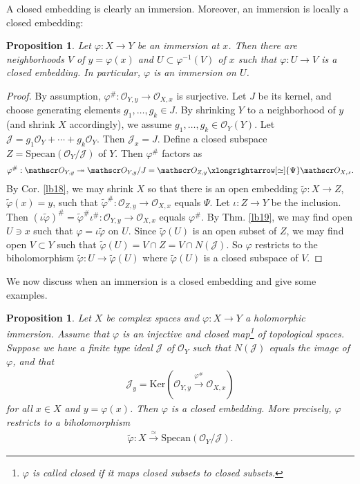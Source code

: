 \documentclass[12pt,b5paper,notitlepage]{report}
\theoremstyle{definition}
\theoremstyle{plain}
\newtheorem{pp}[df]{Proposition}
\newcommand{\mc}{\mathcal}
\newcommand{\wtd}{\widetilde}
\newcommand{\scr}{\mathscr}
\newcommand{\Ker}{\mathrm{Ker}}
\newcommand{\Specan}{\mathrm{Specan}}
\numberwithin{equation}{section}
\begin{document}
A closed embedding is clearly an immersion. Moreover, an immersion is locally a closed embedding:




\begin{pp}\label{lb21}
Let $\varphi:X\rightarrow Y$ be an immersion at $x$. Then there are neighborhoods $V$ of $y=\varphi(x)$ and $U\subset\varphi^{-1}(V)$ of $x$  such that $\varphi:U\rightarrow V$ is a closed embedding. In particular, $\varphi$ is an immersion on $U$.
\end{pp}




\begin{proof}
By assumption, $\varphi^\#:\scr O_{Y,y}\rightarrow\scr O_{X,x}$ is surjective. Let $J$ be its kernel, and choose generating elements $g_1,\dots,g_k\in J$. By shrinking $Y$ to a neighborhood of $y$ (and shrink $X$ accordingly), we assume $g_1,\dots,g_k\in\scr O_Y(Y)$. Let $\mc J=g_1\scr O_Y+\cdots+g_k\scr O_Y$. Then $\mc J_x=J$. Define a closed subspace $Z=\Specan(\scr O_Y/\mc J)$ of $Y$. Then $\varphi^\#$ factors as
\begin{align*}
\varphi^\#:\scr O_{Y,y}\twoheadrightarrow \scr O_{Y,y}/J=\scr O_{Z,y}\xlongrightarrow[\simeq]{\Psi}\scr O_{X,x}.
\end{align*}
By Cor. \ref{lb18}, we may shrink $X$ so that there is an open embedding $\wtd\varphi:X\rightarrow Z$, $\wtd\varphi(x)=y$, such that $\wtd\varphi^\#:\scr O_{Z,y}\rightarrow\scr O_{X,x}$ equals $\Psi$. Let $\iota:Z\rightarrow Y$ be the inclusion. Then $(\iota\wtd\varphi)^\#=\wtd\varphi^\#\iota^\#:\scr O_{Y,y}\rightarrow\scr O_{X,x}$ equals $\varphi^\#$. By Thm. \ref{lb19}, we may find open $U\ni x$  such that $\varphi=\iota\wtd\varphi$ on $U$. Since $\wtd\varphi(U)$ is an open subset of $Z$, we may find open $V\subset Y$ such that $\wtd\varphi(U)=V\cap Z=V\cap N(\mc J)$. So $\varphi$ restricts to the biholomorphism $\wtd\varphi:U\rightarrow\wtd\varphi(U)$ where $\wtd\varphi(U)$ is a closed subspace of $V$.
\end{proof}





We now discuss when an immersion is a closed embedding and give some examples.

\begin{pp}\label{lb14}
Let $X$ be complex spaces and  $\varphi:X\rightarrow Y$ a holomorphic immersion. Assume that $\varphi$ is an injective and closed map\footnote{$\varphi$ is called closed if it maps closed subsets to closed subsets.} of topological spaces. Suppose we have a finite type ideal $\mc J$ of $\scr O_Y$ such that $N(\mc J)$ equals the image of $\varphi$, and that
\begin{align}
\mc J_y=\Ker(\scr O_{Y,y}\xrightarrow{\varphi^\#}\scr O_{X,x})\label{eq9}
\end{align}
for all $x\in X$ and $y=\varphi(x)$. Then $\varphi$ is a closed embedding. More precisely, $\varphi$ restricts to a biholomorphism
\begin{align}
\wtd\varphi:X\xrightarrow{\simeq}\Specan(\scr O_Y/\mc J).\label{eq10}
\end{align}
\end{pp}
\end{document}
